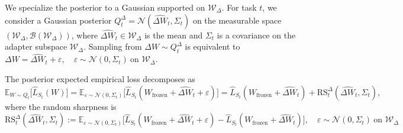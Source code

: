\documentclass{article}
\begin{document}
We specialize the posterior to a Gaussian supported on $\mathcal W_\Delta$. For task $t$, we consider a Gaussian posterior \( Q_t^{\Delta} = \mathcal{N}(\hat{\Delta W}_t, \Sigma_t) \) on the measurable space \( (\mathcal{W}_\Delta, \mathcal{B}(\mathcal{W}_\Delta)) \), where \( \hat{\Delta W}_t \in \mathcal{W}_\Delta \) is the mean and \( \Sigma_t\) is a covariance on the adapter subspace \( \mathcal{W}_\Delta \). Sampling from \( \Delta W \sim Q_t^{\Delta} \) is equivalent to 
$
\Delta W = \hat{\Delta W}_t + \varepsilon, \quad \varepsilon \sim \mathcal{N}(0, \Sigma_t) \ \text{on } \mathcal{W}_\Delta.
$ 

\begin{lemma}
    The posterior expected empirical loss decomposes as
\begin{equation*}
    \mathbb{E}_{W\sim Q_t}\big[\hat{L}_{S_t}(W)\big]
= \mathbb{E}_{\varepsilon\sim\mathcal N(0,\Sigma_t)}
    \big[\hat{L}_{S_t}(W_\mathrm {frozen }+\hat{\Delta W}_t+\varepsilon)\big]
= \hat{L}_{S_t}(W_\mathrm {frozen }+\hat{\Delta W}_t)
  + \mathrm{RS}_t^{\Delta}(\hat{\Delta W}_t,\Sigma_t),
\end{equation*}
where the random sharpness is
$$
\mathrm{RS}_t^{\Delta}(\hat{\Delta W}_t,\Sigma_t)
:= \mathbb{E}_{\varepsilon\sim\mathcal N(0,\Sigma_t)}
   \big[\hat{L}_{S_t}(W_\mathrm {frozen }+\hat{\Delta W}_t+\varepsilon)
       - \hat{L}_{S_t}(W_\mathrm {frozen }+\hat{\Delta W}_t)\big],\quad
\varepsilon\sim\mathcal N(0,\Sigma_t)\ \text{on } \mathcal W_\Delta$$
\end{lemma}
\end{document}
